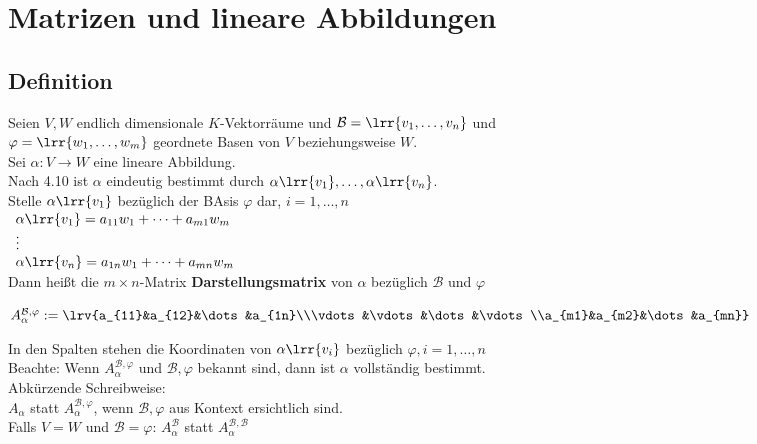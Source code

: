 \newpage
\section{Matrizen und lineare Abbildungen}
\subsection{Definition}
	Seien $V,W$ endlich dimensionale $K$-Vektorräume und $\mathcal{B}=\lrr{v_1,\dots,v_n}$ und\\
	$\varphi=\lrr{w_1,\dots,w_m}$ geordnete Basen von $V$ beziehungsweise $W$.\\
	Sei $\alpha: V\rightarrow W$ eine lineare Abbildung.\\
	Nach 4.10 ist $\alpha$ eindeutig bestimmt durch $\alpha\lrr{v_1},\dots,\alpha\lrr{v_n}$.\\
	Stelle $\alpha\lrr{v_1}$ bezüglich der BAsis $\varphi$ dar, $i=1,\dots,n$\\
	$\begin{array}{l}
		\alpha\lrr{v_1}=a_{11}w_1+\dots+a_{m1}w_m\\
		\vdots\\
		\alpha\lrr{v_n}=a_{1n}w_1+\dots+a_{mn}w_m
	\end{array}$\\
	Dann heißt die $m\times n$-Matrix \textbf{Darstellungsmatrix} von $\alpha$ bezüglich $\mathcal{B}$ und $\varphi$
	
	$A_{\alpha}^{\mathcal{B}, \varphi}:=\lrv{a_{11}&a_{12}&\dots&a_{1n}\\\vdots&\vdots&\dots&\vdots\\a_{m1}&a_{m2}&\dots&a_{mn}}$
	
	In den Spalten stehen die Koordinaten von $\alpha\lrr{v_i}$ bezüglich $\varphi, i=1,\dots,n$\\
	Beachte: Wenn $A_{\alpha}^{\mathcal{B}, \varphi}$ und $\mathcal{B},\varphi$ bekannt sind, dann ist $\alpha$ vollständig bestimmt.\\
	Abkürzende Schreibweise:\\
	$A_\alpha$ statt $A_{\alpha}^{\mathcal{B}, \varphi}$, wenn $\mathcal{B},\varphi$ aus Kontext ersichtlich sind.\\
	Falls $V=W$ und $\mathcal{B}=\varphi$: $A_{\alpha}^{\mathcal{B}}$ statt $A_{\alpha}^{\mathcal{B}, \mathcal{B}}$
	
